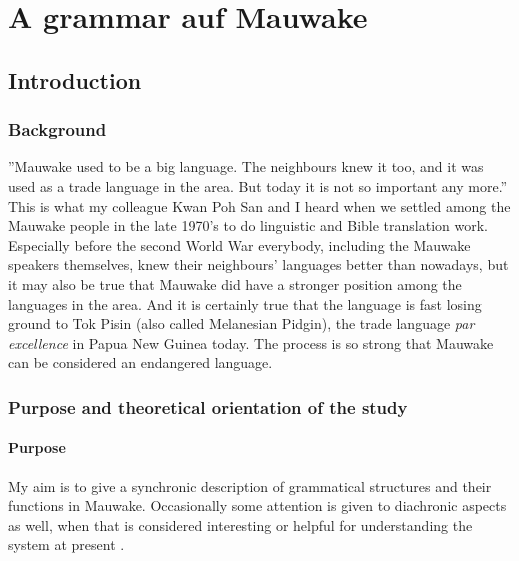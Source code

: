 
\chapter{A grammar auf Mauwake}
\section{Introduction}


\subsection{Background}

''Mauwake used to be a big language. The neighbours knew it too, and it was used as a trade language in the area. But today it is not so important any more.'' This is what my colleague Kwan Poh San and I heard when we settled among the Mauwake people in the late 1970's to do linguistic and Bible translation work. Especially before the second World War everybody, including the Mauwake speakers themselves, knew their neighbours' languages better than nowadays, but it may also be true that Mauwake did have a stronger position among the languages in the area. And it is certainly true that the language is fast losing ground to Tok Pisin (also called Melanesian Pidgin), the trade language \textit{par excellence} in Papua New Guinea today.  The process is so strong that Mauwake can be considered an endangered language.

\subsection{Purpose and theoretical orientation of the study}
\subsubsection{Purpose}
My aim is to give a synchronic description of grammatical structures and their functions in Mauwake. Occasionally some attention is given to diachronic aspects as well, when that is considered interesting or helpful for understanding the system at present \citep[20]{EvansEtAl2006}%
. 

